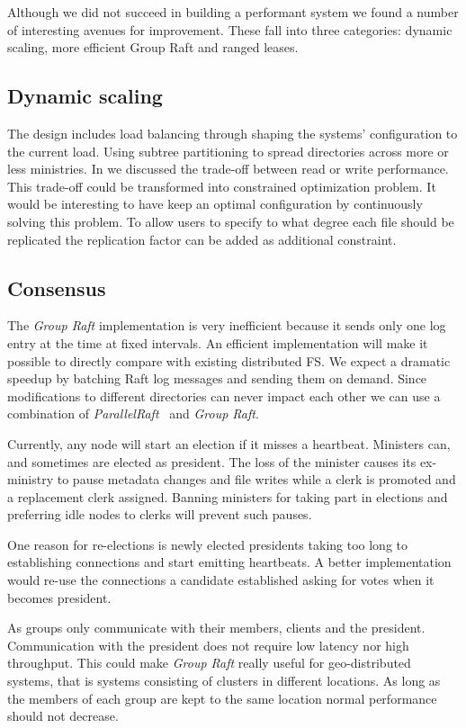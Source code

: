 Although we did not succeed in building a performant system we found a number of interesting avenues for improvement. These fall into three categories: dynamic scaling, more efficient Group Raft and ranged leases.

\subsection{Dynamic scaling}
The \name design includes load balancing through shaping the systems' configuration to the current load. Using subtree partitioning to spread directories across more or less ministries. In  we discussed the trade-off between read or write performance. This trade-off could be transformed into constrained optimization problem. It would be interesting to have \name{} keep an optimal configuration by continuously solving this problem. To allow users to specify to what degree each file should be replicated the replication factor can be added as additional constraint.

\subsection{Consensus}
The \textit{Group Raft} implementation is very inefficient because it sends only one log entry at the time at fixed intervals. An efficient implementation will make it possible to directly compare \name{} with existing distributed FS. We expect a dramatic speedup by batching Raft log messages and sending them on demand. Since modifications to different directories can never impact each other we can use a combination of \textit{ParallelRaft}~\cite{polarfs} and \textit{Group Raft}.

Currently, any node will start an election if it misses a heartbeat. Ministers can, and sometimes are elected as president. The loss of the minister causes its ex-ministry to pause metadata changes and file writes while a clerk is promoted and a replacement clerk assigned. Banning ministers for taking part in elections and preferring idle nodes to clerks will prevent such pauses.

One reason for re-elections is newly elected presidents taking too long to establishing connections and start emitting heartbeats. A better implementation would re-use the connections a candidate established asking for votes when it becomes president.

As groups only communicate with their members, clients and the president. Communication with the president does not require low latency nor high throughput. This could make \textit{Group Raft} really useful for geo-distributed systems, that is systems consisting of clusters in different locations. As long as the members of each group are kept to the same location normal performance should not decrease.

